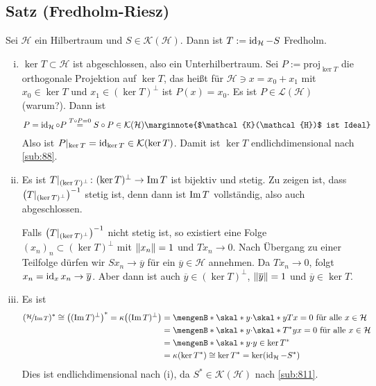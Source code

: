 \subsection{Satz (Fredholm-Riesz)} %
\label{sub:92}
Sei $\mathcal{H}$ ein Hilbertraum und $S \in \mathcal{K}(\mathcal{H})$. Dann ist $T := \id_\mathcal{H}-S$ Fredholm.
\begin{enumerate}[(i)]
	\item $\ker T \subset \mathcal{H}$ ist abgeschlossen, also ein Unterhilbertraum. Sei $P := \mathrm{proj}_{\ker T}$ die orthogonale Projektion auf $\ker T$, das heißt 
	für $\mathcal{H} \ni x = x_0 + x_1$ mit $x_0 \in \ker T$ und $x_1 \in (\ker T)^\bot$ ist $P(x)=x_0$. Es ist $P \in \mathcal{L}(\mathcal{H})$ (warum?).
	Dann ist 
	\[
		P=\id_\mathcal{H} \circ P \stackrel{T \circ P=0}{=} S \circ P \in \mathcal{K}(\mathcal{H}) \marginnote{$\mathcal{K}(\mathcal{H})$ ist Ideal}
	\]
	Also ist $P|_{\ker T} = \id_{\ker T} \in \mathcal{K}(\ker T)$. Damit ist $\ker T$ endlichdimensional nach \ref{sub:88}.
	\item Es ist $T|_{(\ker T)^\bot} \colon (\ker T)^\bot \to \im T$ ist bijektiv und stetig. Zu zeigen ist, dass $\enbrace*{T|_{(\ker T)^\bot}} ^{-1}$ stetig ist, denn dann
	ist $\im T$ vollständig, also auch abgeschlossen. 
	
	Falls $\enbrace*{T|_{(\ker T)^\bot}}^{-1}$ nicht stetig ist, so existiert eine Folge $(x_n)_n \subset (\ker T)^\bot$
	mit $\norm{x_n}=1$ und $T x_n \to 0$. Nach Übergang zu einer Teilfolge dürfen wir $S x_n \to \overline{y}$ für ein $\overline{y} \in \mathcal{H}$ annehmen. Da
	$T x_n \to 0$, folgt $x_n = \id_x x_n \to \overline{y}$. Aber dann ist auch $\overline{y} \in (\ker T)^\bot$, $\norm{\overline{y}}=1$ und $\overline{y} \in \ker T$. 
	\light
	\item Es ist 
	\begin{align*}
		(\nicefrac{\mathcal{H}}{\im T})^* \cong\enbrace*{(\im T)^\bot}^* = \kappa \enbrace*{(\im T)^\bot} 
		&= \set[\skal*{y}{\cdot}]{\skal*{y}{T x}=0 \text{ für alle }x \in \mathcal{H}} \\
		&= \set[\skal*{y}{\cdot }]{\skal*{T^*y}{x}=0 \text{ für alle }x \in \mathcal{H}} \\
		&= \set[\skal*{y}{\cdot}]{y \in \ker T^*} \\
		&= \kappa \enbrace*{\ker T^*}  \cong \ker T^* = \ker(\id_\mathcal{H}- S^*)
	\end{align*}
	Dies ist endlichdimensional nach (i), da $S^* \in \mathcal{K}(\mathcal{H})$ nach \ref{sub:811}.\bewende
\end{enumerate}

